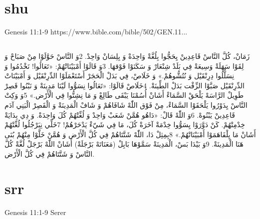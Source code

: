 \documentclass[12pt,fleqn,titlepage,twoside,a4paper]{book}
\begin{document}
\section{shu}

Genesis 11:1-9 https://www.bible.com/bible/502/GEN.11...

\begin{arab}[utf]
\section*{}

زَمَانْ، كُلَّ النَّاسْ قَاعِدِينْ يِحَجُّوا بِلُغَّةْ وَاحِدَةْ وَ بِلِسَانْ وَاحِدْ. 2وَ النَّاسْ حَوَّلَوْا مِنْ صَبَاحْ وَ لِقَوْا سَهَلَةْ وَسِيعَةْ فِي بَلَدْ شِنْعَارْ وَ سَكَنَوْا فَوْقهَا. 3وَ قَالَوْا أَمْبَيْنَاتْهُمْ: «تَعَالُوا! نَخْدُمُوا وَ نِسَلُّلُوا دِرِنْقَيْل وَ نُتُشُّوهُمْ.»
وَ خَلَاصْ، فِي بَدَلْ الْحَجَرْ أَسْتَعْمَلَوْا الدِّرِنْقَيْل وَ أَمْبَيْنَاتْ الدِّرِنْقَيْل صَبَّوْا الزِّفْت بَدَلْ الطِّينَةْ. 4خَلَاصْ قَالَوْا: «تَعَالُوا نِسَوُّوا لَيْنَا مَدِينَةْ وَ نَبْنُوا قَصِرْ طَوِيلْ الرَّاسَهْ يَلْحَقْ السَّمَاءْ أَشَانْ أُسُمْنَا يَبْقَى طَالِعْ وَ مَا نِشِتُّوا فِي الْأَرْض.»
5وَ وَكِتْ النَّاسْ يِدَوْرُوا يَلْحَقَوْا السَّمَاءْ، مِنْ فَوْق اللّٰهْ شَافَاهُمْ وَ شَافْ الْمَدِينَةْ وَ الْقَصِرْ الْبَنِي آدَم قَاعِدِينْ يَبْنُوهْ. 6وَ اللّٰهْ قَالْ: «دَاهُو هُمَّنْ شَعَبْ وَاحِدْ وَ لُغِّتْهُمْ كُلَ وَاحِدَةْ. وَ دِي بِدَايَةْ خِدْمِتْهُمْ. كَنْ دَوَّرَوْا يِسَوُّوا خِدْمَةْ آخَرَةْ كُلَ، مَا فِي شَيّءْ يَدْحَرْهُمْ! 7خَلِّي نِبَرْجُلُوا لُغِّتْهُمْ أَشَانْ مَا يِلْفَاهَمَوْا أَمْبَيْنَاتْهُمْ.»
8بِمِثِلْ دَا، اللّٰهْ شَتَّتَاهُمْ فِي كُلَّ الْأَرْض وَ هُمَّنْ خَلَّوْا مِنْهُمْ بُنَى هَنَا الْمَدِينَةْ. 9وَ بَيْدَا بَسْ، الْمَدِينَةْ سَمَّوْهَا بَابِلْ (مَعَنَاتَهْ بَرْجَلَةْ) أَشَانْ اللّٰهْ بَرْجَلْ لُغَّةْ كُلَّ النَّاسْ وَ شَتَّتَاهُمْ فِي كُلَّ الْأَرْض.
\end{arab}

\section{srr}

Genesis 11:1-9 Serer
\end{document}
